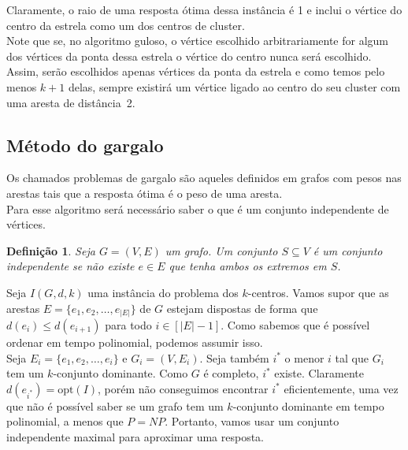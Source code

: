 \documentclass[12pt]{article}
\newcommand{\opt}{\ensuremath{\mathrm{opt}}}
\newtheorem{definition}[theorem]{Definição}
\newcommand{\NP}{\mathit{NP}}
\begin{document}
      Claramente, o raio de uma resposta ótima dessa instância é 1 e inclui o vértice do centro da estrela como um dos centros de cluster. \\
      Note que se, no algoritmo guloso, o vértice escolhido arbitrariamente for algum dos vértices da ponta dessa estrela o vértice do centro nunca será escolhido. Assim, serão escolhidos apenas vértices da ponta da estrela e como temos pelo menos $k+1$ delas, sempre existirá um vértice ligado ao centro do seu cluster com uma aresta de distância~2.
\newpage



\subsection{Método do gargalo}
Os chamados problemas de gargalo são aqueles definidos em grafos com pesos nas arestas tais que a resposta ótima é o peso de uma aresta. \\
Para esse algoritmo será necessário saber o que é um conjunto independente de vértices.
\begin{definition}
    Seja $G = (V,E)$ um grafo. Um conjunto $S \subseteq V$ é um conjunto \emph{independente} se não existe $e \in E$ que tenha ambos os extremos em $S$.
\end{definition}
Seja $I(G,d,k)$ uma instância do problema dos $k$-centros. Vamos supor que as arestas $E = \{e_1,e_2,\ldots,e_{|E|}\}$ de $G$ estejam dispostas de forma que $d(e_i) \leq d(e_{i+1})$ para todo $i \in [|E|-1]$. Como sabemos que é possível ordenar em tempo polinomial, podemos assumir isso. \\
Seja $E_i = \{e_1,e_2,\ldots,e_i\}$ e $G_i = (V,E_i)$. Seja também $i^*$ o menor $i$ tal que $G_i$ tem um $k$-conjunto dominante. Como $G$ é completo, $i^*$ existe. Claramente $d(e_{i^*}) = \opt(I)$, porém não conseguimos encontrar $i^*$ eficientemente, uma vez que não é possível saber se um grafo tem um $k$-conjunto dominante em tempo polinomial, a menos que $P = \NP$. Portanto, vamos usar um conjunto independente maximal para aproximar uma resposta.
\end{document}
